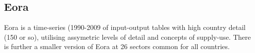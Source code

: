 \subsection{Eora}

Eora is a time-series (1990-2009 of input-output tables with high country detail (150 or so), utilising assymetric levels of detail and concepts of supply-use. There is further a smaller version of Eora at 26 sectors common for all countries.
